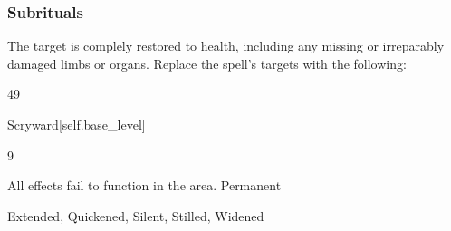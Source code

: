 \subsubsection{Subrituals}
The target is complely restored to health, including any missing or irreparably damaged limbs or organs.
Replace the spell's targets with the following:
\begin{spellcontent}
\begin{augmenttargetinginfo}
 49
\end{augmenttargetinginfo}
\end{spellcontent}
\begin{spellsection}{Scryward}[self.base_level]
\begin{spellcontent}
\begin{spelltargetinginfo}
 9
\end{spelltargetinginfo}
\begin{spelleffects}
\spelleffect
All  effects fail to function in the area.
\spelldur Permanent
\end{spelleffects}
\end{spellcontent}
\begin{spellfooter}
 Extended, Quickened, Silent, Stilled, Widened
\end{spellfooter}
\begin{spellsubcontent}
\end{spellsubcontent}
\end{spellsection}
